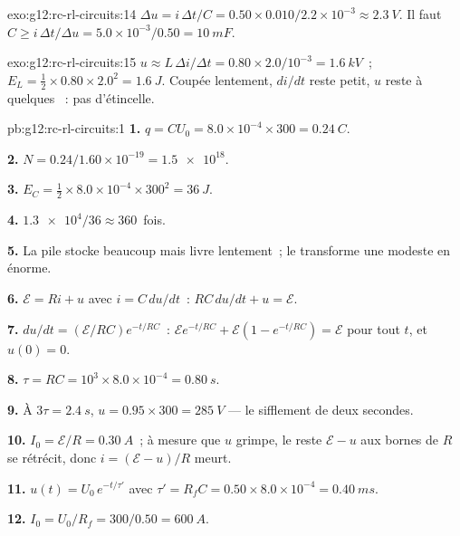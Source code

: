 \begin{solution}{exo:g12:rc-rl-circuits:14}
$\Delta u = i\,\Delta t/C = 0.50 \times 0.010/2.2\times10^{-3} \approx
\qty{2.3}{V}$. Il faut $C \geq i\,\Delta t/\Delta u =
5.0\times10^{-3}/0.50 = \qty{10}{mF}$.
\end{solution}

\begin{solution}{exo:g12:rc-rl-circuits:15}
$u \approx L\,\Delta i/\Delta t = 0.80 \times 2.0/10^{-3} =
\qty{1.6}{kV}$~; $E_L = \tfrac12 \times 0.80 \times 2.0^2 =
\qty{1.6}{J}$. Coupée lentement, $di/dt$ reste petit, $u$ reste à
quelques ~: pas d'étincelle.
\end{solution}

\begin{solution}{pb:g12:rc-rl-circuits:1}
\textbf{1.} $q = CU_0 = 8.0\times10^{-4} \times 300 = \qty{0.24}{C}$.

\textbf{2.} $N = 0.24/1.60\times10^{-19} = \num{1.5e18}$.

\textbf{3.} $E_C = \tfrac12 \times 8.0\times10^{-4} \times 300^2 =
\qty{36}{J}$.

\textbf{4.} $\num{1.3e4}/36 \approx 360$~fois.

\textbf{5.} La pile stocke beaucoup mais livre lentement~; le
 transforme une
 modeste en \emph{}
énorme.

\textbf{6.} $\mathcal{E} = Ri + u$ avec $i = C\,du/dt$~:
$RC\,du/dt + u = \mathcal{E}$.

\textbf{7.} $du/dt = (\mathcal{E}/RC)e^{-t/RC}$~:
$\mathcal{E}e^{-t/RC} + \mathcal{E}(1 - e^{-t/RC}) = \mathcal{E}$
pour tout $t$, et $u(0) = 0$.

\textbf{8.} $\tau = RC = 10^3 \times 8.0\times10^{-4} = \qty{0.80}{s}$.

\textbf{9.} À $3\tau = \qty{2.4}{s}$, $u = 0.95 \times 300 =
\qty{285}{V}$ --- le sifflement de deux secondes.

\textbf{10.} $I_0 = \mathcal{E}/R = \qty{0.30}{A}$~; à mesure que $u$
grimpe, le reste $\mathcal{E} - u$ aux bornes de $R$ se rétrécit, donc
$i = (\mathcal{E}-u)/R$ meurt.

\textbf{11.} $u(t) = U_0\,e^{-t/\tau'}$ avec $\tau' = R_f C =
0.50 \times 8.0\times10^{-4} = \qty{0.40}{ms}$.

\textbf{12.} $I_0 = U_0/R_f = 300/0.50 = \qty{600}{A}$.


\end{solution}
